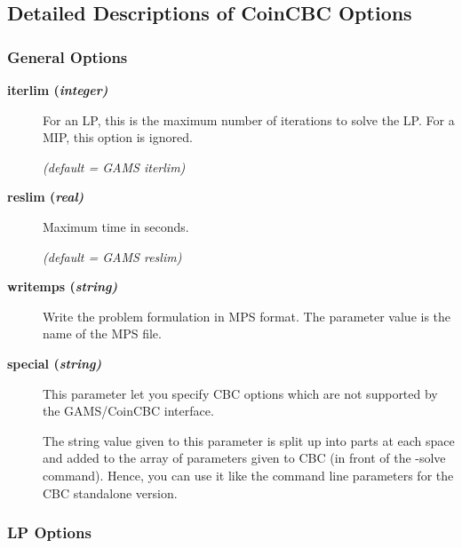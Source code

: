 \subsection{Detailed Descriptions of CoinCBC Options}

\subsubsection{General Options}

\begin{description}

\item[\label{iterlim}\hypertarget{iterlim}
{\textbf{iterlim (\slshape{integer})}}]\hspace{1.0in}

For an LP, this is the maximum number of iterations to solve the LP.
For a MIP, this option is ignored.

\textsl{(default = GAMS iterlim)}

\item[\label{reslim}\hypertarget{reslim}
{\textbf{reslim (\slshape{real})}}]\hspace{1.0in}

Maximum time in seconds.

\textsl{(default = GAMS reslim)}

\item[\label{writemps}\hypertarget{writemps}
{\textbf{writemps (\slshape{string})}}]\hspace{1.0in}

Write the problem formulation in MPS format.
The parameter value is the name of the MPS file.

\item[\label{special}\hypertarget{special}
{\textbf{special (\slshape{string})}}]\hspace{1.0in}

This parameter let you specify CBC options which are not supported by the GAMS/CoinCBC interface.

The string value given to this parameter is split up into parts at each space and added to the array of parameters given to CBC (in front of the -solve command).
Hence, you can use it like the command line parameters for the CBC standalone version.

\end{description}

\subsubsection{LP Options}

